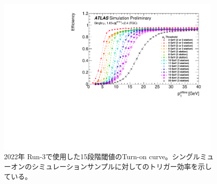 

\begin{figure}[tb]
  \centering
  \includegraphics[clip, width=11cm]{fig/3/PLOT-TRIG-2020-01-fig1.pdf}
  \caption{2022年 Run-3で使用した15段階閾値のTurn-on curve。シングルミューオンのシミュレーションサンプルに対してのトリガー効率を示している。}
  \label{fig:Run3_15_MC5}
\end{figure}

\newpage
\newpage

